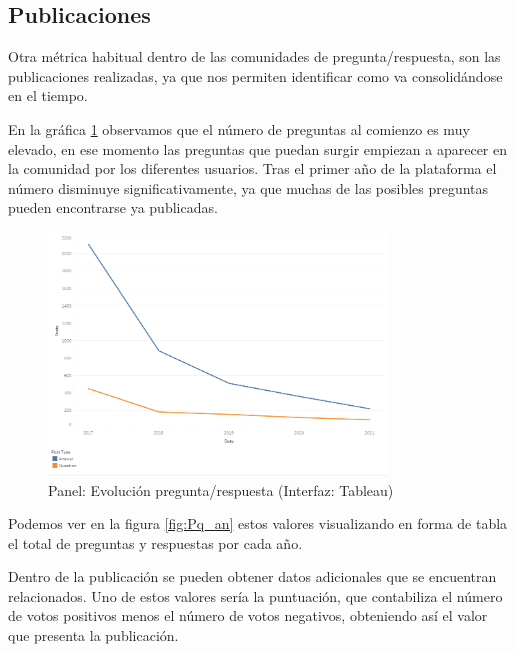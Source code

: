 \documentclass[a4paper, 12pt]{book}
\begin{document}
\subsection{Publicaciones}
Otra métrica habitual dentro de las comunidades de pregunta/respuesta, son las publicaciones realizadas, ya que nos permiten identificar como va consolidándose en el tiempo. 

En la gráfica \ref{figura:evo_post_anual} observamos que el número de preguntas al comienzo es muy elevado, en ese momento las preguntas que puedan surgir empiezan a aparecer en la comunidad por los diferentes usuarios. Tras el primer año de la plataforma el número disminuye significativamente, ya que muchas de las posibles preguntas pueden encontrarse ya publicadas. 

\begin{figure}[ht]
    \centering
    \includegraphics[width=0.8\textwidth]{img/cse/evo_posts_anual.png}
    \caption{Panel: Evolución pregunta/respuesta (Interfaz: Tableau)}
    \label{figura:evo_post_anual}
\end{figure}

Podemos ver en la figura \ref{fig:Pq_an} estos valores visualizando en forma de tabla el total de preguntas y respuestas por cada año.

Dentro de la publicación se pueden obtener datos adicionales que se encuentran relacionados. Uno de estos valores sería la puntuación, que contabiliza el número de votos positivos menos el número de votos negativos, obteniendo así el valor que presenta la publicación. 
\end{document}
